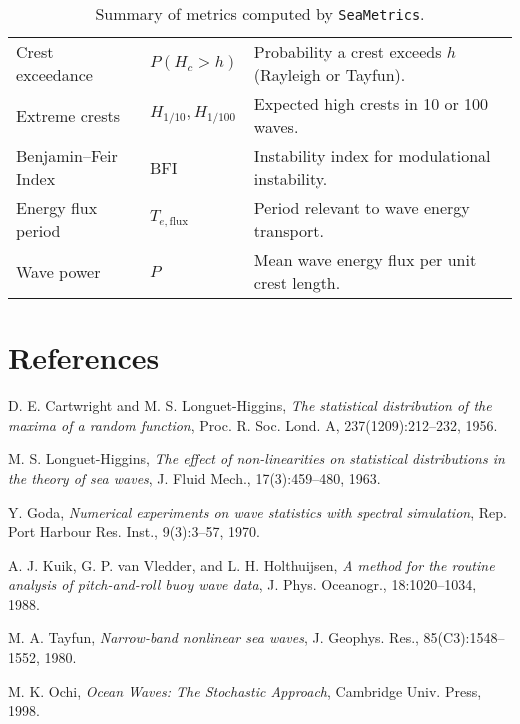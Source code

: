 \documentclass[11pt]{article}
\begin{document}
\begin{table}[h!]
\begin{tabular}{|l|l|p{8cm}|}
\hline
Crest exceedance & $P(H_c>h)$ & Probability a crest exceeds $h$ (Rayleigh or Tayfun). \\
Extreme crests & $H_{1/10}, H_{1/100}$ & Expected high crests in 10 or 100 waves. \\
Benjamin–Feir Index & BFI & Instability index for modulational instability. \\
\hline
Energy flux period & $T_{e,\text{flux}}$ & Period relevant to wave energy transport. \\
Wave power & $P$ & Mean wave energy flux per unit crest length. \\
\hline
\end{tabular}
\caption{Summary of metrics computed by \texttt{SeaMetrics}.}
\label{tab:metrics}
\end{table}


\section{References}

\begin{thebibliography}{9}
D. E. Cartwright and M. S. Longuet-Higgins,
\textit{The statistical distribution of the maxima of a random function},
Proc. R. Soc. Lond. A, 237(1209):212–232, 1956.

M. S. Longuet-Higgins,
\textit{The effect of non-linearities on statistical distributions in the theory of sea waves},
J. Fluid Mech., 17(3):459–480, 1963.

Y. Goda,
\textit{Numerical experiments on wave statistics with spectral simulation},
Rep. Port Harbour Res. Inst., 9(3):3–57, 1970.

A. J. Kuik, G. P. van Vledder, and L. H. Holthuijsen,
\textit{A method for the routine analysis of pitch-and-roll buoy wave data},
J. Phys. Oceanogr., 18:1020–1034, 1988.

M. A. Tayfun,
\textit{Narrow-band nonlinear sea waves},
J. Geophys. Res., 85(C3):1548–1552, 1980.

M. K. Ochi,
\textit{Ocean Waves: The Stochastic Approach},
Cambridge Univ. Press, 1998.
\end{thebibliography}
\end{document}

